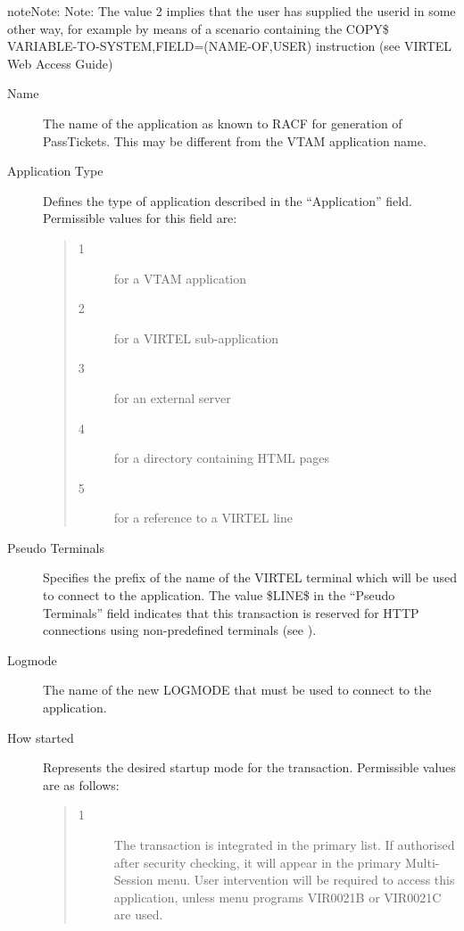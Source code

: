 \documentclass[letterpaper,10pt,english]{sphinxmanual}
\begin{document}
\begin{sphinxadmonition}{note}{Note:}
Note: The value 2 implies that the user has supplied the userid in some other way, for example by means of a scenario containing the COPY\$ VARIABLE-TO-SYSTEM,FIELD=(NAME-OF,USER) instruction (see VIRTEL Web Access Guide)
\end{sphinxadmonition}
\begin{description}
\item[{Name}] \leavevmode
The name of the application as known to RACF for generation of PassTickets. This may be different from the VTAM application name.

\item[{Application Type}] \leavevmode
Defines the type of application described in the “Application” field. Permissible values for this field are:
\begin{quote}
\begin{description}
\item[{1}] \leavevmode
for a VTAM application

\item[{2}] \leavevmode
for a VIRTEL sub-application

\item[{3}] \leavevmode
for an external server

\item[{4}] \leavevmode
for a directory containing HTML pages

\item[{5}] \leavevmode
for a reference to a VIRTEL line

\end{description}
\end{quote}

\item[{Pseudo Terminals}] \leavevmode
Specifies the prefix of the name of the VIRTEL terminal which will be used to connect to the application. The value \$LINE\$ in the “Pseudo Terminals” field indicates that this transaction is reserved for HTTP connections using non-predefined terminals (see {\hyperref[\detokenize{connectivity_guide:v457cn-forceluname}]{}}).

\item[{Logmode}] \leavevmode
The name of the new LOGMODE that must be used to connect to the application.

\item[{How started}] \leavevmode
Represents the desired startup mode for the transaction. Permissible values are as follows:
\begin{quote}
\begin{description}
\item[{1}] \leavevmode
The transaction is integrated in the primary list. If authorised after security checking, it will appear in the primary Multi-Session menu. User intervention will be required to access this application, unless menu programs VIR0021B or VIR0021C are used.


\end{description}
\end{quote}
\end{description}
\end{document}
